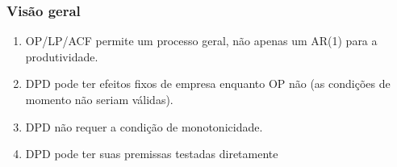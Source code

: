 \documentclass{beamer}
\begin{document}
\begin{frame}\frametitle{Visão geral}

\begin{enumerate}
\item OP/LP/ACF permite um processo geral, não apenas um AR(1) para a produtividade.
\item DPD pode ter efeitos fixos de empresa enquanto OP não (as condições
de momento não seriam válidas).
\item DPD não requer a condição de monotonicidade.
\item DPD pode ter suas premissas testadas diretamente
\end{enumerate}
\end{frame}

\begin{frame}[allowframebreaks]



\end{frame}

\end{document}
